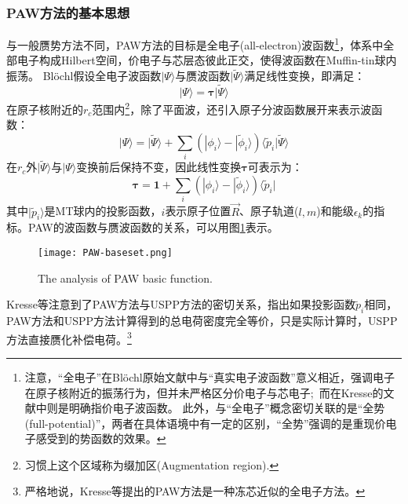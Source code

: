 \subsubsection{PAW方法的基本思想}
与一般赝势方法不同，\textrm{PAW}方法的目标是全电子\textrm{(all-electron)}波函数\footnote{注意，“全电子”在\textrm{Bl\"ochl}原始文献\cite{PRB50-17953_1994}中与“真实电子波函数”意义相近，强调电子在原子核附近的振荡行为，但并未严格区分价电子与芯电子;~而在\textrm{Kresse}的文献\cite{PRB59-1758_1999}中则是明确指价电子波函数。%
此外，与“全电子”概念密切关联的是“全势(full-potential)”，两者在具体语境中有一定的区别，“全势”强调的是重现价电子感受到的势函数的效果。}，体系中全部电子构成\textrm{Hilbert}空间，价电子与芯层态彼此正交，使得波函数在\textrm{Muffin-tin}球内振荡。
\textrm{Bl\"ochl}假设全电子波函数$|\Psi\rangle$与赝波函数$|\tilde\Psi\rangle$满足线性变换，即满足：
\begin{equation}
	|\Psi\rangle=\mathbf{\tau|}\tilde\Psi\rangle
	\label{eq:PAW-Blochl-01}
\end{equation}
在原子核附近的$r_c$范围内\footnote{习惯上这个区域称为缀加区(\textrm{Augmentation region}).}，除了平面波，还引入原子分波函数展开来表示波函数：
\begin{equation}
	|\Psi\rangle=|\tilde\Psi\rangle+\sum_i(|\phi_i\rangle-|\tilde\phi_i\rangle)\langle\tilde p_i|\tilde\Psi\rangle
	\label{eq:PAW-Blochl-02}
\end{equation}
在$r_c$外$|\tilde\Psi\rangle$与$|\Psi\rangle$变换前后保持不变，因此线性变换$\mathbf{\tau}$可表示为：
\begin{equation}
	\mathbf{\tau}=\mathbf{1}+\sum_i(|\phi_i\rangle-|\tilde\phi_i\rangle)\langle\tilde p_i|
	\label{eq:PAW-Blochl-03}
\end{equation}
其中$|\tilde p_i\rangle$是\textrm{MT}球内的投影函数，$i$表示原子位置$\vec R$、原子轨道($l,m$)和能级$\epsilon_k$的指标。\textrm{PAW}的波函数与赝波函数的关系，可以用图\ref{PAW_basic}表示。
\begin{figure}[h!]
\centering
\texttt{[image: PAW-baseset.png]}
\caption{\small \textrm{The analysis of PAW basic function.}}%
\label{PAW_basic}
\end{figure}

\textrm{Kresse}等注意到了\textrm{PAW}方法与\textrm{USPP}方法的密切关系，指出如果投影函数$\tilde p_i$相同，\textrm{PAW}方法和\textrm{USPP}方法计算得到的总电荷密度完全等价，只是实际计算时，\textrm{USPP}方法直接赝化补偿电荷。\footnote{严格地说，\textrm{Kresse}等提出的\textrm{PAW}方法是一种冻芯近似的全电子方法。}

